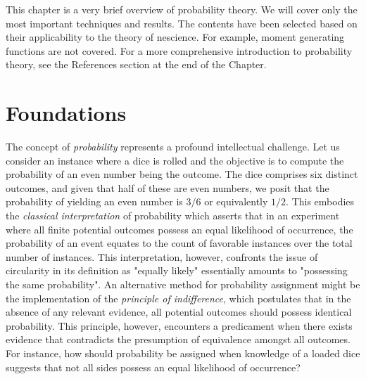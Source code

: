 This chapter is a very brief overview of probability theory. We will cover only the most important techniques and results. The contents have been selected based on their applicability to the theory of nescience. For example, moment generating functions are not covered. For a more comprehensive introduction to probability theory, see the References section at the end of the Chapter.

%
%

\section{Foundations}
\label{sec:probability_foundations}

The concept of \emph{probability} represents a profound intellectual challenge. Let us consider an instance where a dice is rolled and the objective is to compute the probability of an even number being the outcome. The dice comprises six distinct outcomes, and given that half of these are even numbers, we posit that the probability of yielding an even number is $3/6$ or equivalently $1/2$. This embodies the \emph{classical interpretation} of probability which asserts that in an experiment where all finite potential outcomes possess an equal likelihood of occurrence, the probability of an event equates to the count of favorable instances over the total number of instances. This interpretation, however, confronts the issue of circularity in its definition as "equally likely" essentially amounts to "possessing the same probability". An alternative method for probability assignment might be the implementation of the \emph{principle of indifference}, which postulates that in the absence of any relevant evidence, all potential outcomes should possess identical probability. This principle, however, encounters a predicament when there exists evidence that contradicts the presumption of equivalence amongst all outcomes. For instance, how should probability be assigned when knowledge of a loaded dice suggests that not all sides possess an equal likelihood of occurrence?

